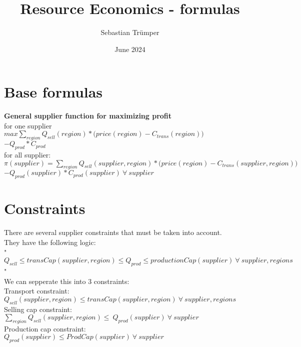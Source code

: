\documentclass{article}
\title{Resource Economics - formulas}
\author{Sebastian Trümper}
\date{June 2024}
\begin{document}
\maketitle

\section{Base formulas}
\textbf{General supplier function for maximizing profit}\\
for one  supplier\\
\quad$max \sum_{region} Q_{sell}(region) *\Big(price(region) - C_{trans}(region)\Big) $\\
\quad$- Q_{prod}*C_{prod}$\\
for all supplier:\\
\quad$\pi(supplier) = \sum_{region} Q_{sell}(supplier, region) *\Big(price(region) - C_{trans}(supplier,region)\Big) $\\
\quad$- Q_{prod}(supplier)*C_{prod}(supplier)\: \forall \:supplier$\\

\section*{Constraints}
There are several supplier constraints that must be taken into account.\\
They have the following logic:\\
"$Q_{sell} \leq transCap(supplier, region) \leq Q_{prod} \leq productionCap(supplier) \: \forall \: supplier,regions$"\\
We can sepperate this into 3 constraints:\\


Transport constraint:\\
\quad$Q_{sell}(supplier, region) \leq transCap(supplier, region)\: \forall \: supplier,regions$\\
Selling cap constraint:\\
\quad$\sum_{region} Q_{sell}(supplier, region) \leq\ Q_{prod}(supplier)\:\forall \: supplier $\\
Production cap constraint:\\
\quad$Q_{prod}(supplier) \leq ProdCap(supplier)\:\forall \: supplier$\\

\hfill
\end{document}
